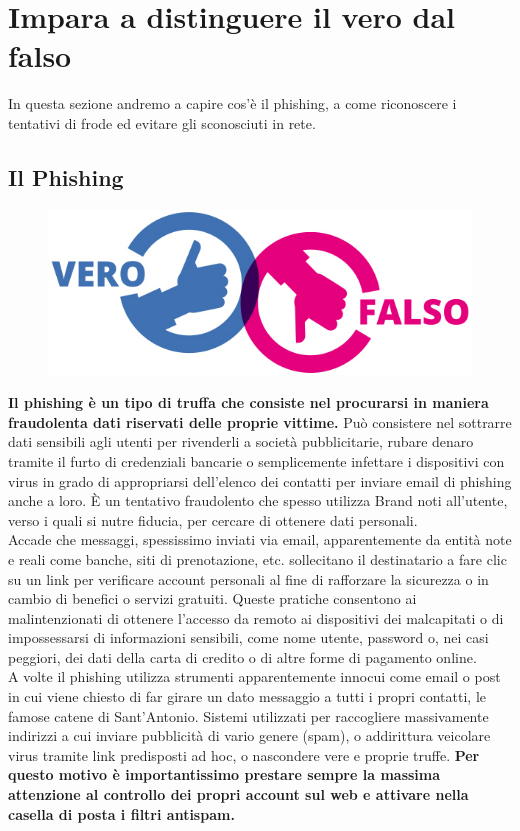 \documentclass{article}
\begin{document}
\pagebreak

\section{Impara a distinguere il vero dal falso}
In questa sezione andremo a capire cos'è il phishing, a come riconoscere i tentativi di frode ed evitare gli sconosciuti in rete.
\subsection{Il Phishing}
\begin{figure}[h!]
	\centering
	\includegraphics[scale=0.7]{VeroFalso.jpg}
\end{figure}
\textbf{Il phishing è un tipo di truffa che consiste nel procurarsi in maniera fraudolenta dati riservati delle proprie vittime.} Può consistere nel sottrarre dati sensibili agli utenti per rivenderli a società pubblicitarie, rubare denaro tramite il furto di credenziali bancarie o semplicemente infettare i dispositivi con virus in grado di appropriarsi dell'elenco dei contatti per inviare email di phishing anche a loro. È un tentativo fraudolento che spesso utilizza Brand noti all’utente, verso i quali si nutre fiducia, per cercare di ottenere dati personali.\\
Accade che messaggi, spessissimo inviati via email, apparentemente da entità note e reali come banche, siti di prenotazione, etc. sollecitano il destinatario a fare clic su un link per verificare account personali al fine di rafforzare la sicurezza o in cambio di benefici o servizi gratuiti. Queste pratiche consentono ai malintenzionati di ottenere l'accesso da remoto ai dispositivi dei malcapitati o di impossessarsi di informazioni sensibili, come nome utente, password o, nei casi peggiori, dei dati della carta di credito o di altre forme di pagamento online.\\
A volte il phishing utilizza strumenti apparentemente innocui come email o post in cui viene chiesto di far girare un dato messaggio a tutti i propri contatti, le famose catene di Sant’Antonio. Sistemi utilizzati per raccogliere massivamente indirizzi a cui inviare pubblicità di vario genere (spam), o addirittura veicolare virus tramite link predisposti ad hoc, o nascondere vere e proprie truffe. \textbf{Per questo motivo è importantissimo prestare sempre la massima attenzione al controllo dei propri account sul web e attivare nella casella di posta i filtri antispam.}\\
\end{document}
